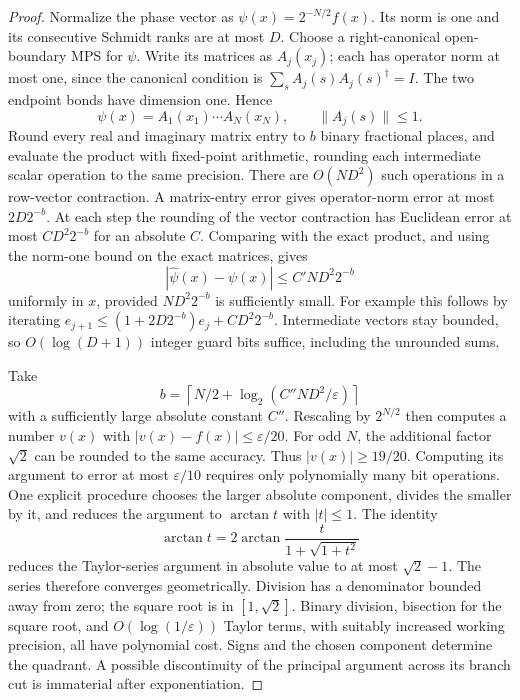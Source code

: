 \documentclass[11pt]{article}
\begin{document}
\begin{proof}
Normalize the phase vector as
$\psi(x)=2^{-N/2}f(x)$. Its norm is one and its consecutive Schmidt
ranks are at most $D$. Choose a right-canonical open-boundary MPS for
$\psi$. Write its matrices as $A_j(x_j)$; each has operator norm at most
one, since the canonical condition is
$\sum_s A_j(s)A_j(s)^\dagger=I$. The two endpoint bonds have dimension
one. Hence
\[
 \psi(x)=A_1(x_1)\cdots A_N(x_N),\qquad \|A_j(s)\|\leq1.
\]
Round every real and imaginary matrix entry to $b$ binary fractional
places, and evaluate the product with fixed-point arithmetic, rounding
each intermediate scalar operation to the same precision. There are
$O(ND^2)$ such operations in a row-vector contraction. A matrix-entry
error gives operator-norm error at most $2D2^{-b}$. At each step the
rounding of the vector contraction has Euclidean error at most
$CD^2 2^{-b}$ for an absolute $C$. Comparing with the exact product,
and using the norm-one bound on the exact matrices, gives
\[
 |\widehat\psi(x)-\psi(x)|\leq C'ND^2 2^{-b}
\]
uniformly in $x$, provided $ND^2 2^{-b}$ is sufficiently small.
For example this follows by iterating
$e_{j+1}\leq(1+2D2^{-b})e_j+CD^2 2^{-b}$.
Intermediate vectors stay bounded, so $O(\log(D+1))$ integer guard bits
suffice, including the unrounded sums.

Take
\[
 b=\left\lceil N/2+\log_2(C''ND^2/\varepsilon)\right\rceil
\]
with a sufficiently large absolute constant $C''$. Rescaling by
$2^{N/2}$ then computes a number $v(x)$ with
$|v(x)-f(x)|\leq\varepsilon/20$. For odd $N$, the additional factor
$\sqrt2$ can be rounded to the same accuracy. Thus $|v(x)|\geq19/20$.
Computing its argument to error at most $\varepsilon/10$ requires
only polynomially many bit operations. One explicit procedure chooses
the larger absolute component, divides the smaller by it, and reduces
the argument to $\arctan t$ with $|t|\leq1$. The identity
\[
 \arctan t=2\arctan\frac{t}{1+\sqrt{1+t^2}}
\]
reduces the Taylor-series argument in absolute value to at most
$\sqrt2-1$. The series therefore converges geometrically. Division has
a denominator bounded away from zero; the square root is in $[1,\sqrt2]$.
Binary division, bisection for the square root, and
$O(\log(1/\varepsilon))$ Taylor terms, with suitably increased working
precision, all have polynomial cost. Signs and the chosen component
determine the quadrant. A possible discontinuity of the principal
argument across its branch cut is immaterial after exponentiation.


\end{proof}
\end{document}
